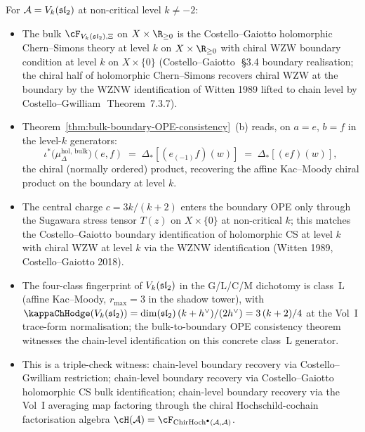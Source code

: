 \begin{remark}[Concrete witness on $\cA = V_k(\fsl_2)$]
\label{rem:bulk-bdry-witness-vk-sl2}%
For $\cA = V_k(\fsl_2)$ at non-critical level $k \neq -2$:
\begin{itemize}
\item The bulk \(\cF_{V_k(\fsl_2),\Xi}\) on
$X \times \R_{\geq 0}$ is
the Costello--Gaiotto holomorphic Chern--Simons theory at level
$k$ on $X \times \R_{\geq 0}$ with chiral WZW boundary
condition at level $k$ on $X \times \{0\}$
(Costello--Gaiotto~\cite{CostelloGaiotto18}\,\S3.4 boundary
realisation; the chiral half of holomorphic Chern--Simons recovers
chiral WZW at the boundary by the WZNW identification of
Witten 1989 lifted to chain level by
Costello--Gwilliam~\cite{CG21}\,Theorem~7.3.7).
\item Theorem~\ref{thm:bulk-boundary-OPE-consistency}~(b) reads,
on $a = e$, $b = f$ in the level-$k$ generators:
\[
 \iota^*\bigl(\mu^{\mathrm{hol},\,\mathrm{bulk}}_\Delta\bigr)
 (e, f)
 \;=\;
 \Delta_*[(e_{(-1)}f)(w)]
 \;=\;
 \Delta_*[(ef)(w)],
\]
the chiral (normally ordered) product, recovering the affine
Kac--Moody chiral product on the boundary at level $k$.
\item The central charge $c = 3k/(k+2)$ enters the boundary OPE
only through the Sugawara stress tensor $T(z)$ on $X \times \{0\}$
at non-critical $k$; this matches the Costello--Gaiotto
boundary identification of holomorphic CS at level $k$ with chiral
WZW at level $k$ via the WZNW identification
(Witten 1989, Costello--Gaiotto 2018).
\item The four-class fingerprint of $V_k(\mathfrak{sl}_2)$ in the
G/L/C/M dichotomy is class~L
(affine Kac--Moody, $r_{\max} = 3$ in the shadow tower), with
$\kappaChHodge(V_k(\fsl_2)) = \dim(\fsl_2)\,(k+h^\vee)/(2h^\vee) =
3\,(k+2)/4$ at the Vol~I trace-form normalisation; the
bulk-to-boundary OPE consistency theorem witnesses the
chain-level identification on this concrete class~L generator.
\item This is a triple-check witness: chain-level boundary
recovery via Costello--Gwilliam restriction; chain-level boundary
recovery via Costello--Gaiotto holomorphic CS bulk identification;
chain-level boundary recovery via the Vol~I averaging map
factoring through the chiral Hochschild-cochain factorisation algebra
$\cH(\cA) = \cF_{\ChirHoch^\bullet(\cA,\cA)}$.
\end{itemize}
\end{remark}

